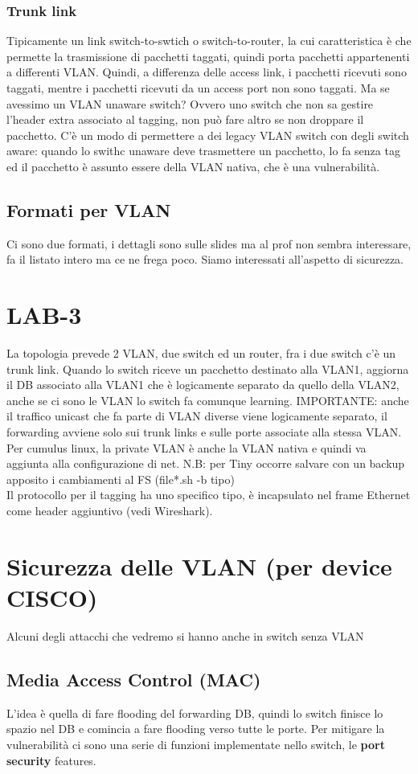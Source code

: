 \documentclass[12pt, oneside]{extbook} %
\begin{document}
\subsubsection{Trunk link}
Tipicamente un link switch-to-swtich o switch-to-router, la cui caratteristica è che permette la trasmissione di pacchetti taggati, quindi porta pacchetti appartenenti a differenti VLAN. Quindi, a differenza delle access link, i pacchetti ricevuti sono taggati, mentre i pacchetti ricevuti da un access port non sono taggati. Ma se avessimo un VLAN unaware switch? Ovvero uno switch che non sa gestire l'header extra associato al tagging, non può fare altro se non droppare il pacchetto. C'è un modo di permettere a dei legacy VLAN switch con degli switch aware: quando lo swithc unaware deve trasmettere un pacchetto, lo fa senza tag ed il pacchetto è assunto essere della VLAN nativa, che è una vulnerabilità.
\subsection{Formati per VLAN}
Ci sono due formati, i dettagli sono sulle slides ma al prof non sembra interessare, fa il listato intero ma ce ne frega poco. Siamo interessati all'aspetto di sicurezza.
\section*{LAB-3}
La topologia prevede 2 VLAN, due switch ed un router, fra i due switch c'è un trunk link. Quando lo switch riceve un pacchetto destinato alla VLAN1, aggiorna il DB associato alla VLAN1 che è logicamente separato da quello della VLAN2, anche se ci sono le VLAN lo switch fa comunque learning. IMPORTANTE: anche il traffico unicast che fa parte di VLAN diverse viene logicamente separato, il forwarding avviene solo sui trunk links e sulle porte associate alla stessa VLAN. Per cumulus linux, la private VLAN è anche la VLAN nativa e quindi va aggiunta alla configurazione di net. N.B: per Tiny occorre salvare con un backup apposito i cambiamenti al FS (file*.sh -b tipo)\\ Il protocollo per il tagging ha uno specifico tipo, è incapsulato nel frame Ethernet come header aggiuntivo (vedi Wireshark).
\section{Sicurezza delle VLAN (per device CISCO)}
Alcuni degli attacchi che vedremo si hanno anche in switch senza VLAN
\subsection{Media Access Control (MAC)}
L'idea è quella di fare flooding del forwarding DB, quindi lo switch finisce lo spazio nel DB e comincia a fare flooding verso tutte le porte.  Per mitigare la vulnerabilità ci sono una serie di funzioni implementate nello switch, le \textbf{port security} features.
\end{document}

